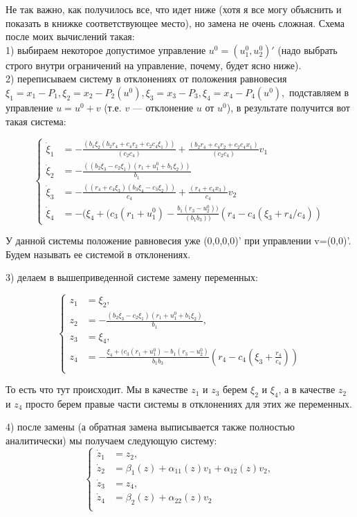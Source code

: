 \documentclass[11pt]{article}
\begin{document}
Не так важно, как получилось все, что идет ниже (хотя я все могу объяснить и показать в книжке соответствующее место), но
замена не очень сложная. Схема после моих вычислений такая:\\
1) выбираем некоторое допустимое управление $u^0=(u^0_1,u^0_2)'$ (надо выбрать строго внутри ограничений на управление, почему, будет ясно ниже).\\
2) переписываем систему в отклонениях от положения равновесия $\xi_1=x_1-P_1, \xi_2=x_2-P_2(u^0), \xi_3=x_3-P_3, \xi_4=x_4-P_4(u^0),$
подставляем в управление $u=u^0+v$ (т.е. $v$ --- отклонение $u$ от $u^0$), в результате получится вот такая система:

$$
    \left\{
    \begin{aligned}
        \dot \xi_1 &= -\frac{(b_1\xi_2(b_2r_4 + c_4r_2 + c_2c_4\xi_1))}{(c_2c_4)} + \frac{(b_2r_4 + c_4r_2 + c_2c_4x_1)}{(c_2c_4)}  v_1\\
        \dot \xi_2 &= -\frac{((b_2\xi_3 - c_2\xi_1)(r_1 + u^0_1 + b_1\xi_2))}{b_1}\\
        \dot \xi_3 &= -\frac{((r_4 + c_4\xi_3)(b_3\xi_4 - c_3\xi_2))}{c_4} + \frac{(r_4 + c_4x_3)}{c_4}  v_2\\
        \dot \xi_4 &= -(\xi_4 + (c_3(r_1 + u^0_1) - \frac{b_1(r_3 - u^0_2))}{(b_1b_3))}(r_4 - c_4(\xi_3 + r_4/c_4))
   \end{aligned}
    \right.
$$


У данной системы положение равновесия уже (0,0,0,0)' при управлении v=(0,0)'. Будем называть ее системой в отклонениях.

3) делаем в вышеприведенной системе замену переменных:

$$
    \left\{
    \begin{aligned}
        z_1 &= \xi_2, \\
        z_2 &= -\frac{(b_2\xi_3 - c_2\xi_1)(r_1 + u^0_1 + b_1\xi_2)}{b_1},\\
        z_3 &= \xi_4, \\
        z_4 &= -\frac{\xi_4 + (c_3(r_1 + u^0_1) - b_1(r_3 - u^0_2)}{b_1b_3}(r_4 - c_4(\xi_3 + \frac{r_4}{c_4})) \\
 \end{aligned}
    \right.
$$


То есть что тут происходит. Мы в качестве $z_1$ и $z_3$ берем $\xi_2$ и $\xi_4$, а в качестве $z_2$ и $z_4$ просто берем правые части
системы в отклонениях для этих же переменных.

4) после замены (а обратная замена выписывается также полностью аналитически) мы получаем следующую систему:
$$
    \left\{
    \begin{aligned}
        \dot z_1 &= z_2, \\
        \dot z_2 &= \beta_1(z)+\alpha_{11}(z)v_1+\alpha_{12}(z)v_2, \\
        \dot z_3 &= z_4, \\
        \dot z_4 &= \beta_2(z)+               \alpha_{22}(z)v_2 \\
 \end{aligned}
    \right.
$$
\end{document}
